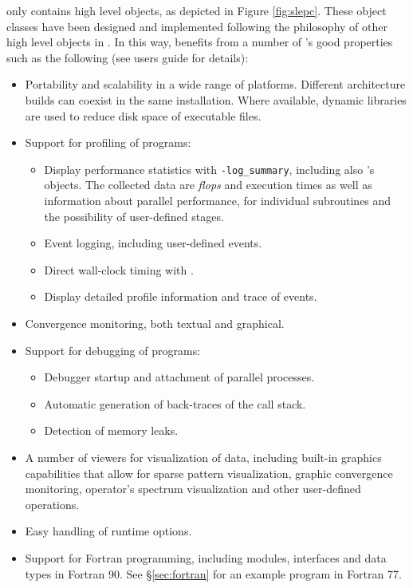 	\slepc only contains high level objects, as depicted in Figure \ref{fig:slepc}. These object classes have been designed and implemented following the philosophy of other high level objects in \petsc. In this way, \slepc benefits from a number of \petsc's good properties such as the following (see \petsc{} users guide for details):
\begin{itemize}
\item Portability and scalability in a wide range of platforms. Different architecture builds can coexist in the same installation. Where available, dynamic libraries are used to reduce disk space of executable files.
\item Support for profiling of programs:
  \begin{itemize}
  \setlength{\itemsep}{0mm}
  \item Display performance statistics with \Verb!-log_summary!, including also \slepc's objects. The collected data are \emph{flops} and execution times as well as information about parallel performance, for individual subroutines and the possibility of user-defined stages.
  \item Event logging, including user-defined events.
  \item Direct wall-clock timing with .
  \item Display detailed profile information and trace of events.
  \end{itemize}
\item Convergence monitoring, both textual and graphical.
\item Support for debugging of programs:
  \begin{itemize}
  \setlength{\itemsep}{0mm}
  \item Debugger startup and attachment of parallel processes.
  \item Automatic generation of back-traces of the call stack.
  \item Detection of memory leaks.
  \end{itemize}
\item A number of viewers for visualization of data, including built-in graphics capabilities that allow for sparse pattern visualization, graphic convergence monitoring, operator's spectrum visualization and other user-defined operations.
\item Easy handling of runtime options.
\item Support for Fortran programming, including modules, interfaces and data types in Fortran 90. See \S\ref{sec:fortran} for an example program in Fortran 77.
\end{itemize}

